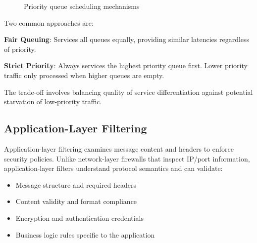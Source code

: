 \documentclass[12pt]{article}
\begin{document}
	\begin{figure}[H]
		\centering
		\caption{Priority queue scheduling mechanisms}
		\label{fig:priority-queues}
	\end{figure}
	
	Two common approaches are:
	
	\textbf{Fair Queuing}: Services all queues equally, providing similar latencies regardless of priority.
	
	\textbf{Strict Priority}: Always services the highest priority queue first. Lower priority traffic only processed when higher queues are empty.
	
	The trade-off involves balancing quality of service differentiation against potential starvation of low-priority traffic.
	
	\subsection{Application-Layer Filtering}
	
	Application-layer filtering examines message content and headers to enforce security policies. Unlike network-layer firewalls that inspect IP/port information, application-layer filters understand protocol semantics and can validate:
	
	\begin{itemize}
		\item Message structure and required headers
		\item Content validity and format compliance
		\item Encryption and authentication credentials
		\item Business logic rules specific to the application
	\end{itemize}
	
\end{document}
